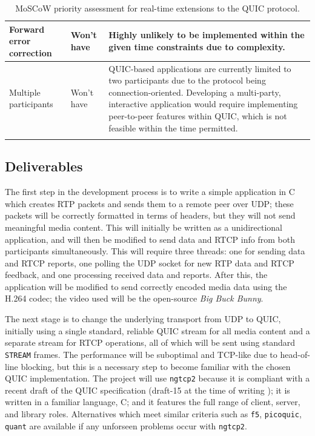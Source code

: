 \documentclass{mprop}
\begin{document}
\begin{longtable}{|p{3.5cm}|l|p{8.5cm}|}
Forward error correction & Won't have & Highly unlikely to be implemented within the given time constraints due to complexity. \\ \hline
Multiple participants & Won't have & QUIC-based applications are currently limited to two participants due to the protocol being connection-oriented. Developing a multi-party, interactive application would require implementing peer-to-peer features within QUIC, which is not feasible within the time permitted.\\
\caption{MoSCoW priority assessment for real-time extensions to the QUIC protocol.}
\label{priority-assessment}
\end{longtable}

\subsection{Deliverables}

The first step in the development process is to write a simple application in C which creates RTP packets and sends them to a remote peer over UDP; these packets will be correctly formatted in terms of headers, but they will not send meaningful media content. This will initially be written as a unidirectional application, and will then be modified to send data and RTCP info from both participants simultaneously. This will require three threads: one for sending data and RTCP reports, one polling the UDP socket for new RTP data and RTCP feedback, and one processing received data and reports. After this, the application will be modified to send correctly encoded media data using the H.264 codec; the video used will be the open-source \textit{Big Buck Bunny}.

The next stage is to change the underlying transport from UDP to QUIC, initially using a single standard, reliable QUIC stream for all media content and a separate stream for RTCP operations, all of which will be sent using standard \texttt{STREAM} frames. The performance will be suboptimal and TCP-like due to head-of-line blocking, but this is a necessary step to become familiar with the chosen QUIC implementation. The project will use \texttt{ngtcp2} because it is compliant with a recent draft of the QUIC specification (draft-15 at the time of writing \cite{quic-implementations}); it is written in a familiar language, C; and it features the full range of client, server, and library roles. Alternatives which meet similar criteria such as \texttt{f5}, \texttt{picoquic}, \texttt{quant} are available if any unforseen problems occur with \texttt{ngtcp2}.
\end{document}
